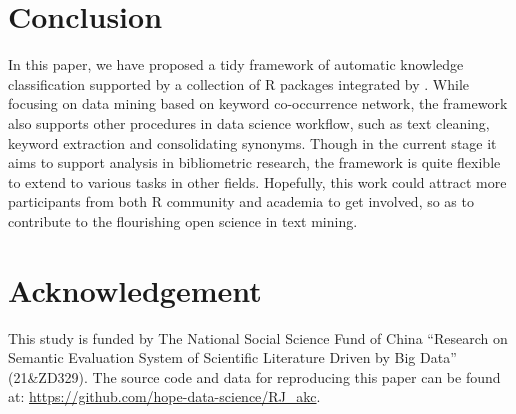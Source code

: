 \hypertarget{conclusion}{%
\section{Conclusion}\label{conclusion}}

In this paper, we have proposed a tidy framework of automatic knowledge
classification supported by a collection of R packages integrated by
. While focusing on data mining based on keyword
co-occurrence network, the framework also supports other procedures in
data science workflow, such as text cleaning, keyword extraction and
consolidating synonyms. Though in the current stage it aims to support
analysis in bibliometric research, the framework is quite flexible to
extend to various tasks in other fields. Hopefully, this work could
attract more participants from both R community and academia to get
involved, so as to contribute to the flourishing open science in text
mining.

\hypertarget{acknowledgement}{%
\section{Acknowledgement}\label{acknowledgement}}

This study is funded by The National Social Science Fund of China
``Research on Semantic Evaluation System of Scientific Literature Driven
by Big Data'' (21\&ZD329). The source code and data for reproducing this
paper can be found at:
\url{https://github.com/hope-data-science/RJ_akc}.



\address{%
Tian-Yuan Huang\\
National Science Library, Chinese Academy of Sciences\\%
Beijing, China\\
%
%
\textit{ORCiD: \href{https://orcid.org/0000-0002-4151-3764}{0000-0002-4151-3764}}\\%
\href{mailto:huangtianyuan@mail.las.ac.cn}{\nolinkurl{huangtianyuan@mail.las.ac.cn}}%
}

\address{%
Li Li\\
National Science Library, Chinese Academy of Sciences; Department of
Library, Information and Archives Management, School of Economics and
Management, University of Chinese Academy of Science\\%
Beijing, China\\
%
%
%
\href{mailto:lili2020@mail.las.ac.cn}{\nolinkurl{lili2020@mail.las.ac.cn}}%
}

\address{%
Liying Yang\\
National Science Library, Chinese Academy of Sciences\\%
Beijing, China\\
%
%
%
\href{mailto:yangly@mail.las.ac.cn}{\nolinkurl{yangly@mail.las.ac.cn}}%
}
